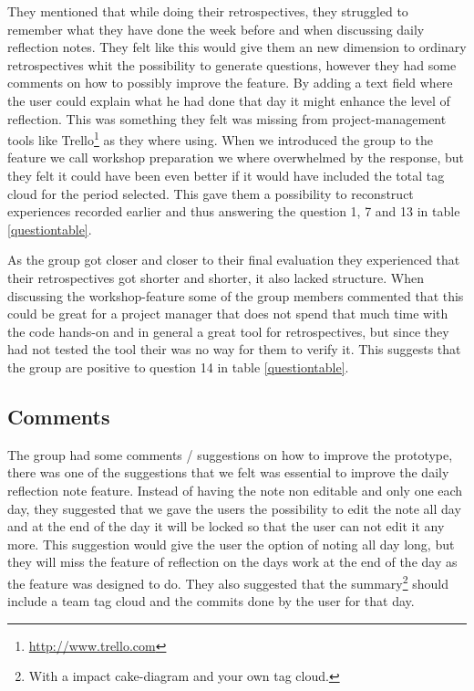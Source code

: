 They mentioned that while doing their retrospectives, they struggled to remember what they have done the week before and when discussing daily reflection notes. They felt like this would give them an new dimension to ordinary retrospectives whit the possibility to generate questions, however they had some comments on how to possibly improve the feature. By adding a text field where the user could explain what he had done that day it might enhance the level of reflection. This was something they felt was missing from project-management tools like Trello\footnote{\url{http://www.trello.com}} as they where using. When we introduced the group to the feature we call workshop preparation we where overwhelmed by the response, but they felt it could have been even better if it would have included the total tag cloud for the period selected. This gave them a possibility to reconstruct experiences recorded earlier and thus answering the question 1, 7 and 13 in table \ref{questiontable}.

As the group got closer and closer to their final evaluation they experienced that their retrospectives got shorter and shorter, it also lacked structure. When discussing the workshop-feature some of the group members commented that this could be great for a project manager that does not spend that much time with the code hands-on and in general a great tool for retrospectives, but since they had not tested the tool their was no way for them to verify it. This suggests that the group are positive to question 14 in table \ref{questiontable}.

\subsection{Comments}
The group had some comments / suggestions on how to improve the prototype, there was one of the suggestions that we felt was essential to improve the daily reflection note feature. Instead of having the note non editable and only one each day, they suggested that we gave the users the possibility to edit the note all day and at the end of the day it will be locked so that the user can not edit it any more. This suggestion would give the user the option of noting all day long, but they will miss the feature of reflection on the days work at the end of the day as the feature was designed to do. They also suggested that the summary\footnote{With a impact cake-diagram and your own tag cloud.} should include a team tag cloud and the commits done by the user for that day.

